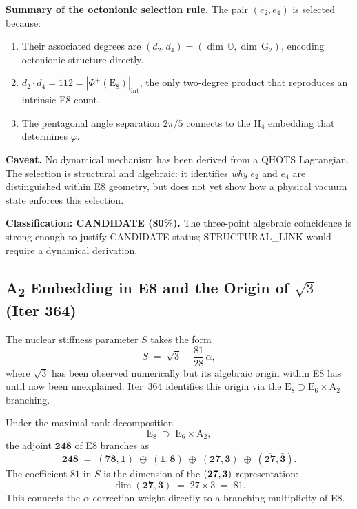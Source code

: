 \documentclass[aps,prd,twocolumn,superscriptaddress,floatfix,nofootinbib]{revtex4-2}
\theoremstyle{definition}
\theoremstyle{remark}
\newcommand{\vp}{\varphi}
\begin{document}
\textbf{Summary of the octonionic selection rule.}
The pair $(e_2, e_4)$ is selected because:
\begin{enumerate}
  \item Their associated degrees are $(d_2, d_4) = (\dim\,\mathbb{O}, \dim\,\mathrm{G}_2)$,
        encoding octonionic structure directly.
  \item $d_2 \cdot d_4 = 112 = |\Phi^+(\mathrm{E}_8)|_{\mathrm{int}}$, the only
        two-degree product that reproduces an intrinsic E8 count.
  \item The pentagonal angle separation $2\pi/5$ connects to the $\mathrm{H}_4$
        embedding that determines $\vp$.
\end{enumerate}

\textbf{Caveat.}  No dynamical mechanism has been derived from a QHOTS Lagrangian.
The selection is structural and algebraic: it identifies \textit{why} $e_2$ and $e_4$
are distinguished within E8 geometry, but does not yet show how a physical vacuum
state enforces this selection.

\textbf{Classification: CANDIDATE (80\%).}  The three-point algebraic coincidence
is strong enough to justify CANDIDATE status; STRUCTURAL\_LINK would require a
dynamical derivation.

\subsection{A\textsubscript{2} Embedding in E8 and the Origin of $\sqrt{3}$ (Iter 364)}
\label{sec:a2-e8-embedding}

The nuclear stiffness parameter $S$ takes the form
\begin{equation}
  S \;=\; \sqrt{3} + \frac{81}{28}\,\alpha,
\end{equation}
where $\sqrt{3}$ has been observed numerically but its algebraic origin within E8
has until now been unexplained.  Iter~364 identifies this origin via the
$\mathrm{E}_8 \supset \mathrm{E}_6 \times \mathrm{A}_2$ branching.

Under the maximal-rank decomposition
\begin{equation}
  \mathrm{E}_8 \;\supset\; \mathrm{E}_6 \times \mathrm{A}_2,
\end{equation}
the adjoint $\mathbf{248}$ of E8 branches as
\begin{equation}
  \mathbf{248} \;=\; (\mathbf{78}, \mathbf{1}) \;\oplus\; (\mathbf{1}, \mathbf{8})
                    \;\oplus\; (\mathbf{27}, \mathbf{3}) \;\oplus\; (\overline{\mathbf{27}}, \bar{\mathbf{3}}).
\end{equation}
The coefficient $81$ in $S$ is the dimension of the $({\bf 27}, {\bf 3})$ representation:
\begin{equation}
  \dim(\mathbf{27}, \mathbf{3}) \;=\; 27 \times 3 \;=\; 81.
\end{equation}
This connects the $\alpha$-correction weight directly to a branching multiplicity of E8.
\end{document}
